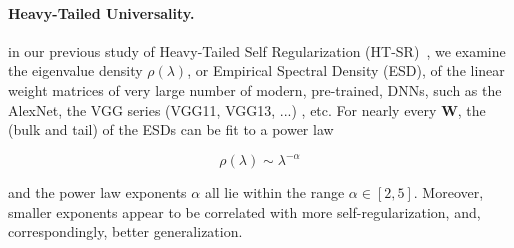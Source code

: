 
\paragraph{Heavy-Tailed Universality.} 

in our previous study of Heavy-Tailed Self Regularization (HT-SR)~\cite{MM18_TR}, we examine the eigenvalue density
$\rho(\lambda)$, or Empirical Spectral  Density (ESD), of the linear weight matrices of very large number of modern, pre-trained, DNNs,
such as the AlexNet, the VGG series (VGG11, VGG13, ...) ,  etc.  For nearly every $\mathbf{W}$, the (bulk and tail) of the ESDs can be fit to a power law

$$\rho(\lambda)\sim\lambda^{-\alpha}$$

and the power law exponents $\alpha$ all lie within the range $\alpha\in[2,5]$.
Moreover, smaller exponents appear to be correlated with more self-regularization, and, correspondingly, 
better generalization.



